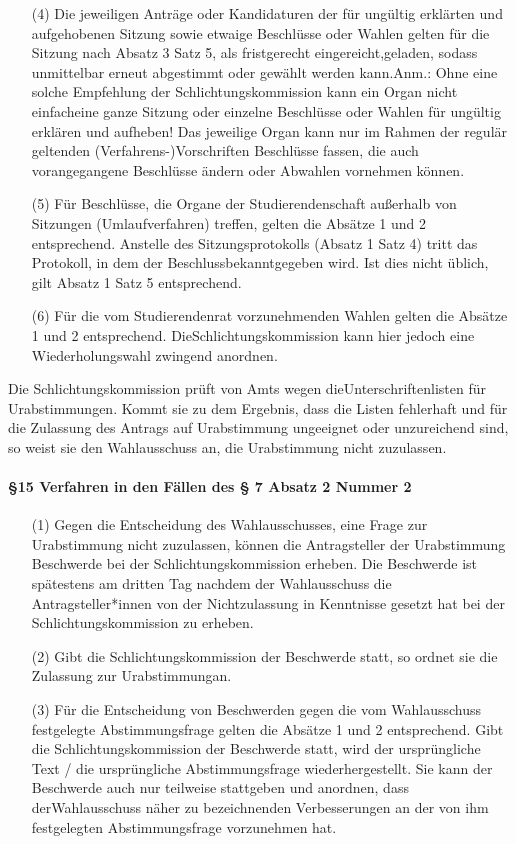 \begin{itemize}
                \item[(4)]    Die jeweiligen Anträge oder Kandidaturen der für ungültig erklärten und aufgehobenen Sitzung sowie etwaige Beschlüsse oder Wahlen gelten für die Sitzung nach Absatz 3 Satz 5, als fristgerecht eingereicht,geladen, sodass unmittelbar erneut abgestimmt oder gewählt werden kann.Anm.: Ohne eine solche Empfehlung der Schlichtungskommission kann ein Organ nicht einfacheine ganze Sitzung oder einzelne Beschlüsse oder Wahlen für ungültig erklären und aufheben! Das jeweilige Organ kann nur im Rahmen der regulär geltenden (Verfahrens-)Vorschriften Beschlüsse fassen, die auch vorangegangene Beschlüsse ändern oder Abwahlen vornehmen können.
                \item[(5)]    Für Beschlüsse, die Organe der Studierendenschaft außerhalb von Sitzungen (Umlaufverfahren) treffen, gelten die Absätze 1 und 2 entsprechend. Anstelle des Sitzungsprotokolls (Absatz 1 Satz 4) tritt das Protokoll, in dem der Beschlussbekanntgegeben wird. Ist dies nicht üblich, gilt Absatz 1 Satz 5 entsprechend.
                \item[(6)]    Für die vom Studierendenrat vorzunehmenden Wahlen gelten die Absätze 1 und 2 entsprechend. DieSchlichtungskommission kann hier jedoch eine Wiederholungswahl zwingend anordnen.
            \end{itemize}
            Die Schlichtungskommission prüft von Amts wegen dieUnterschriftenlisten für Urabstimmungen. Kommt sie zu dem Ergebnis, dass die Listen fehlerhaft und für die Zulassung des Antrags auf Urabstimmung ungeeignet oder unzureichend sind, so weist sie den Wahlausschuss an, die Urabstimmung nicht zuzulassen.
        \paragraph{§15 Verfahren in den Fällen des § 7 Absatz 2 Nummer 2}
            \begin{itemize}
                \item[(1)]    Gegen die Entscheidung des Wahlausschusses, eine Frage zur Urabstimmung nicht zuzulassen, können die Antragsteller der Urabstimmung Beschwerde bei der Schlichtungskommission erheben. Die Beschwerde ist spätestens am dritten Tag nachdem der Wahlausschuss die Antragsteller*innen von der Nichtzulassung in Kenntnisse gesetzt hat bei der Schlichtungskommission zu erheben.
                \item[(2)]    Gibt die Schlichtungskommission der Beschwerde statt, so ordnet sie die Zulassung zur Urabstimmungan.
                \item[(3)]    Für die Entscheidung von Beschwerden gegen die vom Wahlausschuss festgelegte Abstimmungsfrage gelten die Absätze 1 und 2 entsprechend. Gibt die Schlichtungskommission der Beschwerde statt, wird der ursprüngliche Text / die ursprüngliche Abstimmungsfrage wiederhergestellt. Sie kann der Beschwerde auch nur teilweise stattgeben und anordnen, dass derWahlausschuss näher zu bezeichnenden Verbesserungen an der von ihm festgelegten Abstimmungsfrage vorzunehmen hat.
            \end{itemize}
